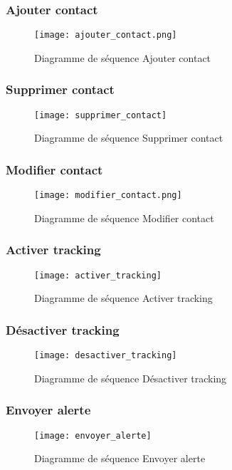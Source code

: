 \subsubsection{Ajouter contact}
\begin{figure}[H]
	\texttt{[image: ajouter\_contact.png]}
	\caption{Diagramme de séquence Ajouter contact}
\end{figure}

\subsubsection{Supprimer contact}
\begin{figure}[H]
	\texttt{[image: supprimer\_contact]}
	\caption{Diagramme de séquence Supprimer contact}
\end{figure}

\subsubsection{Modifier contact}
\begin{figure}[H]
	\texttt{[image: modifier\_contact.png]}
	\caption{Diagramme de séquence Modifier contact}
\end{figure}

\subsubsection{Activer tracking}
\begin{figure}[H]
	\texttt{[image: activer\_tracking]}
	\caption{Diagramme de séquence Activer tracking}
\end{figure}

\subsubsection{Désactiver tracking}
\begin{figure}[H]
	\texttt{[image: desactiver\_tracking]}
	\caption{Diagramme de séquence Désactiver tracking}
\end{figure}

\subsubsection{Envoyer alerte}
\begin{figure}[H]
	\texttt{[image: envoyer\_alerte]}
	\caption{Diagramme de séquence Envoyer alerte}
\end{figure}

